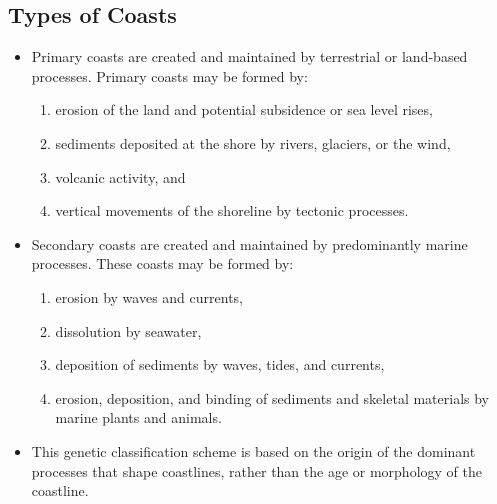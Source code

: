 \documentclass{article}
\begin{document}
	\subsection{Types of Coasts}
	\begin{itemize}
		\item Primary coasts are created and maintained by terrestrial or land-based processes. Primary coasts may be formed by:
		\begin{enumerate}
			\item erosion of the land and potential subsidence or sea level rises,
			\item sediments deposited at the shore by rivers, glaciers, or the wind,
			\item volcanic activity, and
			\item vertical movements of the shoreline by tectonic processes.
		\end{enumerate}
		
		\item Secondary coasts are created and maintained by predominantly marine processes. These coasts may be formed by:
		\begin{enumerate}
			\item erosion by waves and currents,
			\item dissolution by seawater,
			\item deposition of sediments by waves, tides, and currents,
			\item erosion, deposition, and binding of sediments and skeletal materials by marine plants and animals.
		\end{enumerate} 
		\item This genetic classification scheme is based on the origin of the dominant processes that shape coastlines, rather than the age or morphology of the coastline.
	\end{itemize}
	
\end{document}

